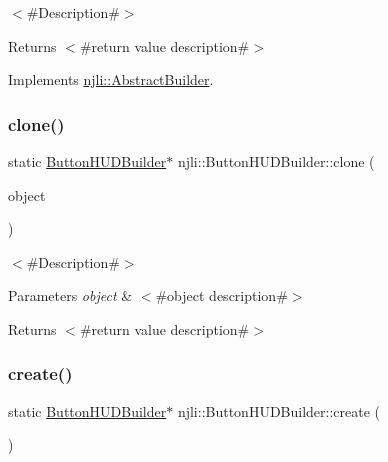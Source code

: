 $<$\#\+Description\#$>$

\begin{DoxyReturn}{Returns}
$<$\#return value description\#$>$ 
\end{DoxyReturn}


Implements \mbox{\hyperlink{classnjli_1_1_abstract_builder_aa1d220053e182c37b31b427499c6eacf}{njli\+::\+Abstract\+Builder}}.

\mbox{\label{classnjli_1_1_button_h_u_d_builder_a33073ea5b117ad2bcc55176788d5be8d}} 
\subsubsection{\texorpdfstring{clone()}{clone()}}
{\footnotesize\ttfamily static \mbox{\hyperlink{classnjli_1_1_button_h_u_d_builder}{Button\+H\+U\+D\+Builder}}$\ast$ njli\+::\+Button\+H\+U\+D\+Builder\+::clone (\begin{DoxyParamCaption}\item[{const \mbox{\hyperlink{classnjli_1_1_button_h_u_d_builder}{Button\+H\+U\+D\+Builder}} \&}]{object }\end{DoxyParamCaption})\hspace{0.3cm}{\ttfamily [static]}}

$<$\#\+Description\#$>$


\begin{DoxyParams}{Parameters}
{\em object} & $<$\#object description\#$>$\\
\hline
\end{DoxyParams}
\begin{DoxyReturn}{Returns}
$<$\#return value description\#$>$ 
\end{DoxyReturn}
\mbox{\label{classnjli_1_1_button_h_u_d_builder_ab7367f8ad374ecbdda4529d1b1263865}} 
\subsubsection{\texorpdfstring{create()}{create()}}
{\footnotesize\ttfamily static \mbox{\hyperlink{classnjli_1_1_button_h_u_d_builder}{Button\+H\+U\+D\+Builder}}$\ast$ njli\+::\+Button\+H\+U\+D\+Builder\+::create (\begin{DoxyParamCaption}{ }\end{DoxyParamCaption})\hspace{0.3cm}{\ttfamily [static]}}

